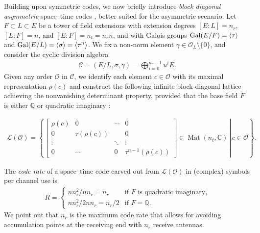 \documentclass[smallextended]{svjour3}
\newcommand{\C}{\mathbb{C}}
\newcommand{\mcl}{\Or_{L}}
\newcommand{\mcc}{\mathcal{C}}
\newcommand{\G}{{\rm Gal}}
\newcommand{\Or}{\mathcal{O}}
\DeclareMathOperator{\Mat}{Mat}
\begin{document}
Building upon symmetric codes, we now briefly introduce \emph{block diagonal asymmetric} space--time codes \cite{HL}, better suited for the asymmetric scenario. 
 Let $F \subset L \subset E$ be a tower of field extensions with extension degrees $[E:L] = n_r$, $[L:F] = n$, and $[E:F]=n_t=n_rn$, and with Galois groups $\G(E/F) = \langle \tau\rangle $ and $\G(E/L) = \langle \sigma\rangle= \langle \tau^n \rangle$. We fix a non-norm element $\gamma \in \mcl\setminus\{0\}$, and consider the cyclic division algebra
\begin{align*}
	\mcc = (E/L,\sigma,\gamma) = \bigoplus\limits_{i=0}^{n_r-1}u^i E.
\end{align*}
Given any order  $\Or $  in $ \mcc$, we identify each element $c \in \Or$ with its maximal representation $\rho(c)$  and construct the following infinite block-diagonal lattice achieving the nonvanishing determinant property, provided that the base field $F$ is either $\mathbb{Q}$ or quadratic imaginary \cite{HL}:
 
\begin{align*}
	\mathcal{L}(\Or) = \left\{\left.\begin{bmatrix} \rho(c) & 0 & \cdots & 0 \\ 0 & \tau\left(\rho(c)\right) & & 0 \\ \vdots & & \ddots & \vdots \\ 0 & \cdots & 0 & \tau^{n-1}\left(\rho(c)\right) \end{bmatrix} \in \Mat(n_t,\C)\, \right|\, c \in \Or \right\}.
\end{align*} 

\begin{remark}
The \emph{code rate} \cite{HL} of a space--time code carved out from $\mathcal{L}(\Or)$ in (complex) symbols per channel use is 
\begin{align*}
  R = \begin{cases}
  		nn_r^2/nn_r=n_r &\mbox{if $F$ is quadratic imaginary,} \\ 
  		nn_r^2/2nn_r=n_r/2 &\mbox{if $F=\mathbb{Q}$.} 
	\end{cases} 
\end{align*}
We point out that $n_r$ is the maximum code rate that allows for avoiding accumulation points at the receiving end with $n_r$ receive antennas.
\end{remark}
\end{document}
